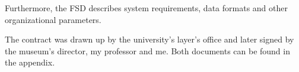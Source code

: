 Furthermore, the \ac{FSD} describes system requirements, data formats and other organizational parameters. 

The contract was drawn up by the university's layer's office and later signed by the museum's director, my professor and me. Both documents can be found in the appendix.

%
